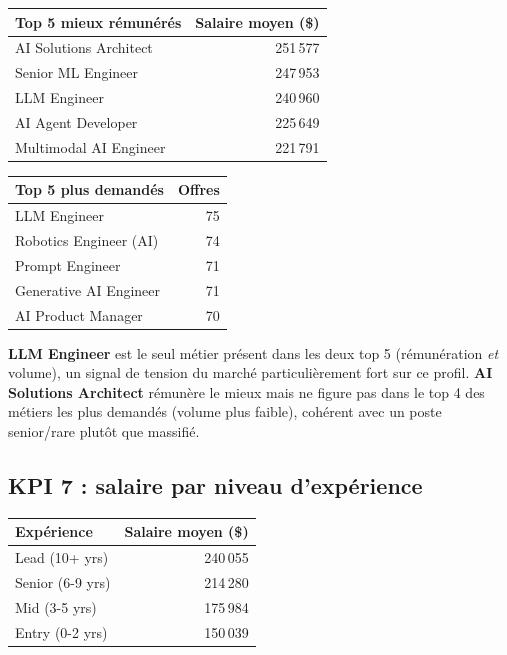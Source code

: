 \begin{center}
\begin{tabular}{lr}
\toprule
Top 5 mieux rémunérés & Salaire moyen (\$) \\
\midrule
AI Solutions Architect & 251\,577 \\
Senior ML Engineer & 247\,953 \\
LLM Engineer & 240\,960 \\
AI Agent Developer & 225\,649 \\
Multimodal AI Engineer & 221\,791 \\
\bottomrule
\end{tabular}
\quad
\begin{tabular}{lr}
\toprule
Top 5 plus demandés & Offres \\
\midrule
LLM Engineer & 75 \\
Robotics Engineer (AI) & 74 \\
Prompt Engineer & 71 \\
Generative AI Engineer & 71 \\
AI Product Manager & 70 \\
\bottomrule
\end{tabular}
\end{center}

\begin{constat}[Interprétation]
\textbf{LLM Engineer} est le seul métier présent dans les deux top 5
(rémunération \emph{et} volume), un signal de tension du marché
particulièrement fort sur ce profil. \textbf{AI Solutions Architect}
rémunère le mieux mais ne figure pas dans le top 4 des métiers les plus
demandés (volume plus faible), cohérent avec un poste senior/rare plutôt
que massifié.
\end{constat}

\subsection{KPI 7 : salaire par niveau d'expérience}

\begin{center}
\begin{tabular}{lr}
\toprule
Expérience & Salaire moyen (\$) \\
\midrule
Lead (10+ yrs) & 240\,055 \\
Senior (6-9 yrs) & 214\,280 \\
Mid (3-5 yrs) & 175\,984 \\
Entry (0-2 yrs) & 150\,039 \\
\bottomrule
\end{tabular}
\end{center}

